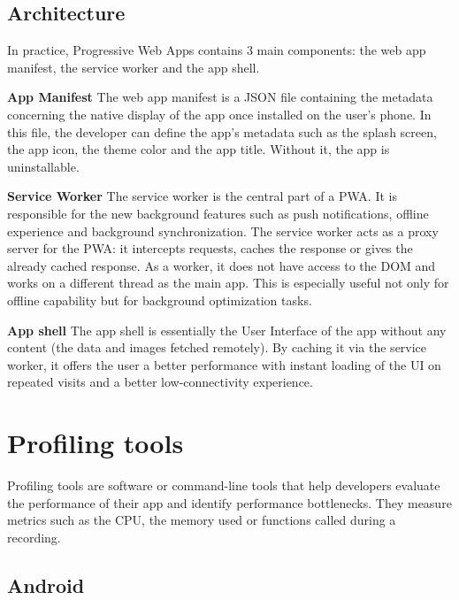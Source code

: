 \documentclass{kththesis}
\begin{document}
\subsection{Architecture}

In practice, Progressive Web Apps contains 3 main components: the web app manifest, the service worker and the app shell. 

\medskip
\textbf{App Manifest} \newline
The web app manifest is a JSON file containing the metadata concerning the native display of the app once installed on the user's phone. In this file, the developer can define the app's metadata such as the splash screen, the app icon, the theme color and the app title. Without it, the app is uninstallable.

\medskip
\textbf{Service Worker} \newline
The service worker is the central part of a PWA. It is responsible for the new background features such as push notifications, offline experience and background synchronization\cite{SW_def}. The service worker acts as a proxy server for the PWA: it intercepts requests, caches the response or gives the already cached response. As a worker, it does not have access to the DOM and works on a different thread as the main app. This is especially useful not only for offline capability but for background optimization tasks.

\medskip
\textbf{App shell} \newline
The app shell is essentially the User Interface of the app without any content \cite{AppShell_def} (the data and images fetched remotely). By caching it via the service worker, it offers the user a better performance with instant loading of the UI on repeated visits and a better low-connectivity experience.


\section{Profiling tools}

Profiling tools are software or command-line tools that help developers evaluate the performance of their app and identify performance bottlenecks. They measure metrics such as the CPU, the memory used or functions called during a recording.

\subsection{Android}
\end{document}
